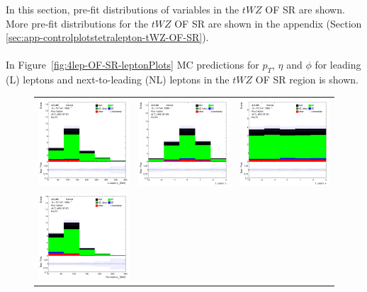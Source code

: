 In this section, pre-fit distributions of variables in the $tWZ$ OF SR are shown. More pre-fit distributions for the $tWZ$ OF SR are shown in the appendix (Section \ref{sec:app-controlplotstetralepton-tWZ-OF-SR}).\\\\

In Figure~\ref{fig:4lep-OF-SR-leptonPlots} MC predictions for $p_{T}$, $\eta$ and $\phi$ for leading (L) leptons and next-to-leading (NL) leptons in the $tWZ$ OF SR region is shown.

\begin{figure}[htbp]
  \begin{tabular}{ccc}


    \includegraphics[width=.3\textwidth]{figures/PreFitPlots/lep4_tWZ_4T_OF_L_lepton_pt.png} &
    \includegraphics[width=.3\textwidth]{figures/PreFitPlots/lep4_tWZ_4T_OF_L_lepton_eta.png} &
    \includegraphics[width=.3\textwidth]{figures/PreFitPlots/lep4_tWZ_4T_OF_L_lepton_phi.png} \\
    \includegraphics[width=.3\textwidth]{figures/PreFitPlots/lep4_tWZ_4T_OF_NL_lepton_pt.png} &

\end{tabular}
\end{figure}
